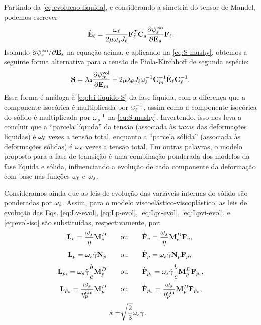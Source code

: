 \documentclass[Tese.tex]{subfiles}
\begin{document}
Partindo da \cref{eq:evolucao-liquida}, e considerando a simetria do tensor de Mandel, podemos escrever
\begin{equation}
\dot{\mathbf{E}}_\ell = \dfrac{\omega_\ell}{2\mu\omega_sJ_\ell}\mathbf{F}_\ell^T\mathbf{C}_s\dfrac{\partial\psi_s^\text{iso}}{\partial\mathbf{E}_s}\mathbf{F}_\ell.
\end{equation}
Isolando ${\partial\psi_s^\text{iso}}/{\partial\mathbf{E}_s}$ na equação acima, e aplicando na \cref{eq:S-mushy}, obtemos a seguinte forma alternativa para a tensão de Piola-Kirchhoff de segunda espécie:
\begin{equation}
\mathbf{S} = \lambda_{\theta}\dfrac{\partial\psi_m^\text{vol}}{\partial\mathbf{E}_m} +  2\mu\lambda_{\theta}J_\ell\omega_\ell^{-1}\mathbf{C}_m^{-1}\dot{\mathbf{E}}_\ell\mathbf{C}_\ell^{-1}. \label{eq:S-mushy2}
\end{equation}
Essa forma é análoga à \cref{eq:lei-liquido-S} da fase líquida, com a diferença que a componente isocórica é multiplicada por $\omega_\ell^{-1}$, assim como a componente isocórica do sólido é multiplicada por $\omega_s^{-1}$ na \cref{eq:S-mushy}. Invertendo, isso nos leva a concluir que a ``parcela líquida'' da tensão (associada às taxas das deformações líquidas) é $\omega_\ell$ vezes a tensão total, enquanto a ``parcela sólida'' (associada às deformações sólidas) é $\omega_s$ vezes a tensão total. Em outras palavras, o modelo proposto para a fase de transição é uma combinação ponderada dos modelos da fase líquida e sólida, influenciando a evolução de cada componente da deformação com base nas funções $\omega_\ell$ e $\omega_s$.

Consideramos ainda que as leis de evolução das variáveis internas do sólido são ponderadas por $\omega_s$. Assim, para o modelo viscoelástico-viscoplástico, as leis de evolução das Eqs. \eqref{eq:Lv-evol}, \eqref{eq:Lp-evol}, \eqref{eq:Lpi-evol}, \eqref{eq:Lpvi-evol}, e \eqref{eq:evol-iso} são substituídas, respectivamente, por:
\begin{align}
\mathbf{L}_v = \dfrac{\omega_s}{\eta}\mathbf{M}_e^D \qquad&\text{ou}\qquad \dot{\mathbf{F}}_v = \dfrac{\omega_s}{\eta}\mathbf{M}_e^D\mathbf{F}_v, \label{eq:Lv-evol-mushy} \\[0.1cm]
\mathbf{L}_p = \omega_s\dot{\gamma}\mathbf{N}_p  \qquad&\text{ou}\qquad \dot{\mathbf{F}}_p = \omega_s\dot{\gamma}\mathbf{N}_p\mathbf{F}_p, \label{eq:Lp-evol-mushy} \\[0.1cm]
\mathbf{L}_{p_i} = \omega_s\dot{\gamma}\dfrac{b}{c}\mathbf{M}_p^D \qquad&\text{ou}\qquad \dot{\mathbf{F}}_{p_i} = \omega_s\dot{\gamma}\dfrac{b}{c}\mathbf{M}_p^D\mathbf{F}_{p_i}, \label{eq:Lpi-evol-mushy}\\[0.1cm]
\mathbf{L}_{\tilde{p}_v} = \dfrac{\omega_s}{\eta_{p}^\text{cin}}\mathbf{M}_{\tilde{p}}^D \qquad&\text{ou}\qquad \dot{\mathbf{F}}_{\tilde{p}_v} = \dfrac{\omega_s}{\eta_{p}^\text{cin}}\mathbf{M}_{\tilde{p}}^D\mathbf{F}_{\tilde{p}_v}, \label{eq:Lpvi-evol-mushy} \\[0.1cm]
\dot{\kappa} = &\sqrt{\dfrac{2}{3}}\omega_s\dot{\gamma}. \label{eq:evol-iso-mushy}
\end{align}
\end{document}
